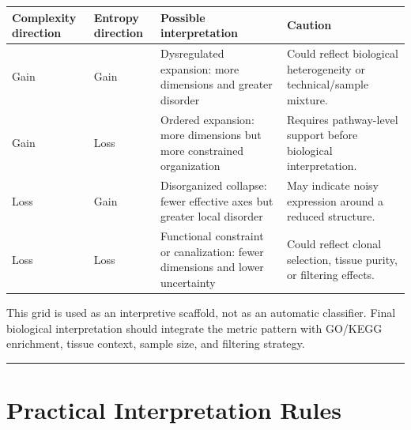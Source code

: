 \documentclass[
  letterpaper,
  DIV=11,
  numbers=noendperiod,
  openany,
  oneside]{scrreprt}
\begin{document}
\begin{longtable}[]{@{}
  >{\raggedright\arraybackslash}p{}
  >{\raggedright\arraybackslash}p{}
  >{\raggedright\arraybackslash}p{}
  >{\raggedright\arraybackslash}p{}@{}}
\toprule\noalign{}
\begin{minipage}[b]{\linewidth}\raggedright
Complexity direction
\end{minipage} & \begin{minipage}[b]{\linewidth}\raggedright
Entropy direction
\end{minipage} & \begin{minipage}[b]{\linewidth}\raggedright
Possible interpretation
\end{minipage} & \begin{minipage}[b]{\linewidth}\raggedright
Caution
\end{minipage} \\
\midrule\noalign{}
\endhead
\bottomrule\noalign{}
\endlastfoot
Gain & Gain & Dysregulated expansion: more dimensions and greater
disorder & Could reflect biological heterogeneity or technical/sample
mixture. \\
Gain & Loss & Ordered expansion: more dimensions but more constrained
organization & Requires pathway-level support before biological
interpretation. \\
Loss & Gain & Disorganized collapse: fewer effective axes but greater
local disorder & May indicate noisy expression around a reduced
structure. \\
Loss & Loss & Functional constraint or canalization: fewer dimensions
and lower uncertainty & Could reflect clonal selection, tissue purity,
or filtering effects. \\
\end{longtable}

This grid is used as an interpretive scaffold, not as an automatic
classifier. Final biological interpretation should integrate the metric
pattern with GO/KEGG enrichment, tissue context, sample size, and
filtering strategy.

\begin{center}\rule{0.5\linewidth}{0.5pt}\end{center}

\section{Practical Interpretation
Rules}\label{practical-interpretation-rules}
\end{document}
